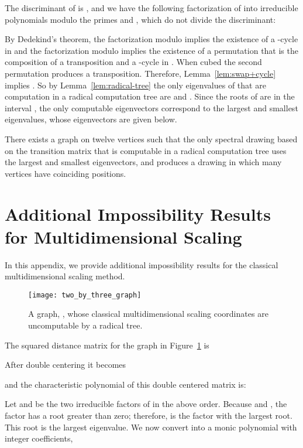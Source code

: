 \documentclass[oribibl,10pt]{llncs}
\begin{document}
\begin{appendix}
The discriminant of  is , and we have the following factorization of  into irreducible polynomials modulo the primes  and , which do not divide the discriminant:

By Dedekind's theorem, the factorization modulo  implies the existence of a -cycle in  and the factorization modulo  implies the existence of a permutation that is the composition of a transposition and a -cycle in . When cubed the second permutation produces a transposition. Therefore, Lemma~\ref{lem:swap+cycle} implies . So by Lemma~\ref{lem:radical-tree} the only eigenvalues of  that are computation in a radical computation tree are  and . Since the roots of  are in the interval , the only computable eigenvectors correspond to the largest and smallest eigenvalues, whose eigenvectors are given below.


\begin{theorem}
There exists a graph on twelve vertices such that the only spectral drawing based on the transition matrix that is computable in a radical computation tree uses the largest and smallest eigenvectors, and produces a drawing in which many vertices have coinciding positions.
\end{theorem}

\clearpage

\section{Additional Impossibility Results for Multidimensional Scaling}
\label{app:mds}

In this appendix, we provide additional impossibility results for the classical multidimensional scaling method.

\begin{figure}[hbt]
\centering
\texttt{[image: two\_by\_three\_graph]}
\caption{A graph, , whose classical multidimensional scaling coordinates are uncomputable by a radical tree.}
\label{fig:2-by-3-graph}
\end{figure}

The squared distance matrix for the graph in Figure~\ref{fig:2-by-3-graph} is 



After double centering it becomes



and the characteristic polynomial of this double centered matrix is:



Let  and  be the two irreducible factors of  in the above order.  Because  and , the factor  has a root greater than zero; therefore,  is the factor with the largest root. This root is the largest eigenvalue.  We now convert  into a monic polynomial with integer coefficients,




\end{appendix}
\end{document}
